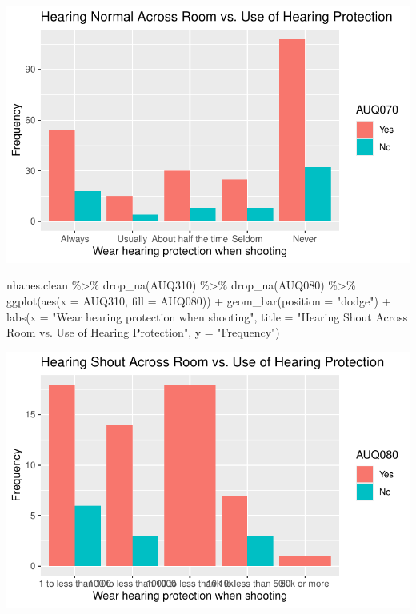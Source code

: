 \documentclass[
  letterpaper,
  DIV=11,
  numbers=noendperiod]{scrreprt}
\newenvironment{Shaded}{\begin{snugshade}}{\end{snugshade}}
\newcommand{\AttributeTok}[1]{\textcolor[rgb]{0.40,0.45,0.13}{#1}}
\newcommand{\FunctionTok}[1]{\textcolor[rgb]{0.28,0.35,0.67}{#1}}
\newcommand{\NormalTok}[1]{\textcolor[rgb]{0.00,0.23,0.31}{#1}}
\newcommand{\SpecialCharTok}[1]{\textcolor[rgb]{0.37,0.37,0.37}{#1}}
\newcommand{\StringTok}[1]{\textcolor[rgb]{0.13,0.47,0.30}{#1}}
\begin{document}
\includegraphics{dataviz_files/figure-pdf/unnamed-chunk-59-5.pdf}

\begin{Shaded}
\begin{Highlighting}[]
\NormalTok{nhanes.clean }\SpecialCharTok{\%\textgreater{}\%}
    \FunctionTok{drop\_na}\NormalTok{(AUQ310) }\SpecialCharTok{\%\textgreater{}\%}
    \FunctionTok{drop\_na}\NormalTok{(AUQ080) }\SpecialCharTok{\%\textgreater{}\%}
    \FunctionTok{ggplot}\NormalTok{(}\FunctionTok{aes}\NormalTok{(}\AttributeTok{x =}\NormalTok{ AUQ310, }\AttributeTok{fill =}\NormalTok{ AUQ080)) }\SpecialCharTok{+} \FunctionTok{geom\_bar}\NormalTok{(}\AttributeTok{position =} \StringTok{"dodge"}\NormalTok{) }\SpecialCharTok{+}
    \FunctionTok{labs}\NormalTok{(}\AttributeTok{x =} \StringTok{"Wear hearing protection when shooting"}\NormalTok{, }\AttributeTok{title =} \StringTok{"Hearing Shout Across Room vs. Use of Hearing Protection"}\NormalTok{,}
        \AttributeTok{y =} \StringTok{"Frequency"}\NormalTok{)}
\end{Highlighting}
\end{Shaded}

\includegraphics{dataviz_files/figure-pdf/unnamed-chunk-59-6.pdf}
\end{document}
